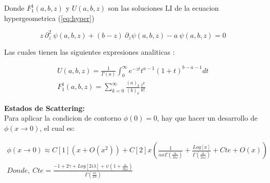 Donde $F _1 ^1(a,b,z)$ y $ U(a,b,z)$ son las soluciones LI de la ecuacion hypergeometrica (\ref{eq:hyper})

\begin{equation}
    z \ \partial ^2 _z \ \psi (a,b,z) + (b-z) \
    \partial _z \psi (a,b,z)
    -a \ \psi (a,b,z) = 0
\label{eq:hyper}
\end{equation}

Las cuales tienen las siguientes expresiones analiticas  : 

\begin{equation}
\begin{array}{c}
	U(a,b,z) = \frac{1}{\Gamma (a)} 
	\int _0 ^{\infty} e ^{-zt}
	t ^{a-1}
	(1+t) ^{b-a-1}
	dt \\
	F _1 ^1 (a,b,z) = \sum _ {k=0} ^{\infty} 
	\frac{(a) _k}{(b) _k} 
	\frac{z ^k}{k!} 
\end{array}
\end{equation}






\textbf{Estados de Scattering:} \\


Para aplicar la condicion de contorno $\phi (0) = 0$, hay que hacer un desarrollo de $\phi(x \rightarrow 0)$, el cual es:

\begin{equation}
\begin{array}{c}
\phi (x \rightarrow 0) \approx
C[1] ( x + O(x ^2)) + 
C[2] x 
\left( 
\frac{1}{  \alpha x  \Gamma ( \frac{ \alpha}{2 i \omega}  )   }  +
\frac{Log[x] }{\Gamma ( \frac{ \alpha}{2 i \omega} ) } + Cte + O(x)
\right)
\\
Donde,  \ Cte = 
\frac{
-1 + 2 \gamma + Log[2 i \lambda] + \psi (1 + \frac{ \alpha}{2 i \omega})
}
{\Gamma (\frac{i \alpha}{2 \lambda})}
\end{array}
\label{eq.scat}
\end{equation}

